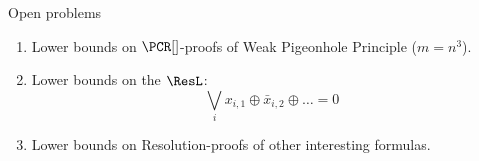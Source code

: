 \begin{frame}{Open problems}

    \begin{enumerate}
        \item Lower bounds on $\PCR[]$-proofs of Weak Pigeonhole Principle ($m = n^3$).
            
        \pause
        \item Lower bounds on the $\ResL$:
            $$
                \bigvee\limits_{i} x_{i, 1} \oplus \bar{x}_{i, 2} \oplus \dots = 0
            $$
        \pause
        \item Lower bounds on Resolution-proofs of other interesting formulas.
    \end{enumerate}
\end{frame}